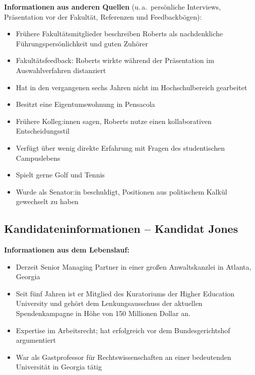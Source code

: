 \textbf{Informationen aus anderen Quellen}
(u.\,a.\ persönliche Interviews, Präsentation vor der Fakultät, Referenzen und Feedbackbögen):
\begin{itemize}
  \item Frühere Fakultätsmitglieder beschreiben Roberts als nachdenkliche Führungspersönlichkeit und guten
    Zuhörer
  \item Fakultätsfeedback: Roberts wirkte während der Präsentation im Auswahlverfahren distanziert
  \item Hat in den vergangenen sechs Jahren nicht im Hochschulbereich gearbeitet
  \item Besitzt eine Eigentumswohnung in Pensacola
  \item Frühere Kolleg:innen sagen, Roberts nutze einen kollaborativen Entscheidungsstil
  \item Verfügt über wenig direkte Erfahrung mit Fragen des studentischen Campuslebens
  \item Spielt gerne Golf und Tennis
  \item Wurde als Senator:in beschuldigt, Positionen aus politischem Kalkül gewechselt zu haben
\end{itemize}

\clearpage
\subsection*{Kandidateninformationen -- Kandidat Jones}
\thispagestyle{empty}

\textbf{Informationen aus dem Lebenslauf:}
\begin{itemize}
  \item Derzeit Senior Managing Partner in einer großen Anwaltskanzlei in Atlanta, Georgia
  \item Seit fünf Jahren ist er Mitglied des Kuratoriums der Higher Education University
    und gehört dem Lenkungsausschuss der aktuellen Spendenkampagne in Höhe von
    150 Millionen Dollar an.
  \item Expertise im Arbeitsrecht; hat erfolgreich vor dem Bundesgerichtshof argumentiert
  \item War als Gastprofessor für Rechtswissenschaften an einer bedeutenden Universität in
    Georgia tätig
\end{itemize}

